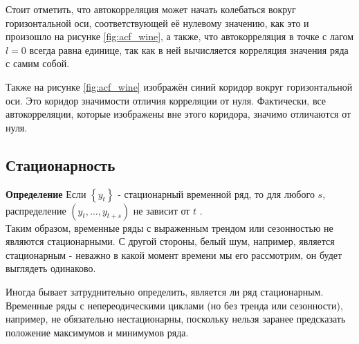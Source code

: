 Стоит отметить, что автокорреляция может начать колебаться вокруг горизонтальной оси, 
соответствующей её нулевому значению, как это и произошло на рисунке \ref{fig:acf_wine}, 
а также, что автокорреляция в точке с лагом $l = 0$ всегда равна единице, 
так как в ней вычисляется корреляция значения ряда с самим собой.

Также на рисунке \ref{fig:acf_wine} изображён синий коридор вокруг горизонтальной оси. 
Это коридор значимости отличия корреляции от нуля. Фактически, все автокорреляции, 
которые изображены вне этого коридора, значимо отличаются от нуля.

\subsection{Стационарность}

\textbf{Определение} Если $\left\{y_t\right\}$ - стационарный временной ряд, то 
для любого $s$, распределение $(y_t, \dots, y_{t+s})$ не зависит от $t$ \cite{Forecasting_Hyndman}. \\

Таким образом, временные ряды с выраженным трендом или сезонностью не являются стационарными.
С другой стороны, белый шум, например, является стационарным - неважно в какой момент времени 
мы его рассмотрим, он будет выглядеть одинаково.

Иногда бывает затруднительно определить, является ли ряд стационарным. Временные ряды с 
непереодическими циклами (но без тренда или сезонности), например, не обязательно нестационарны, поскольку 
нельзя заранее предсказать положение максимумов и минимумов ряда.